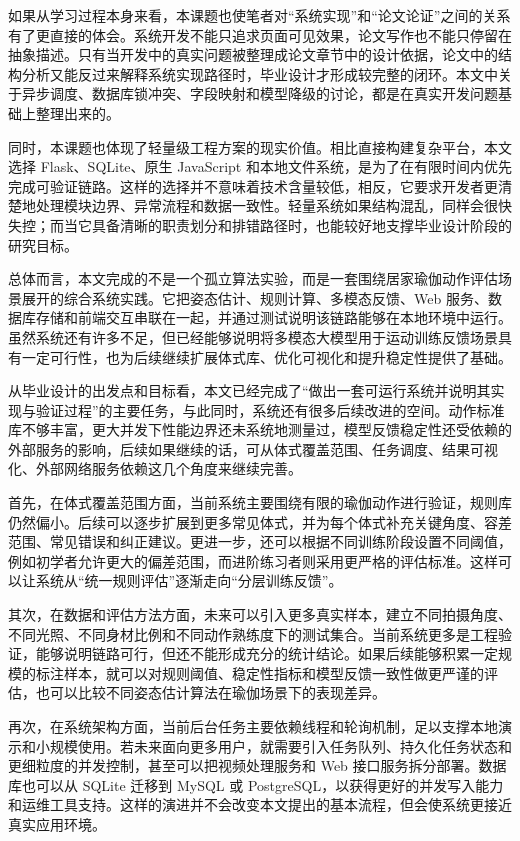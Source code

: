 如果从学习过程本身来看，本课题也使笔者对“系统实现”和“论文论证”之间的关系有了更直接的体会。系统开发不能只追求页面可见效果，论文写作也不能只停留在抽象描述。只有当开发中的真实问题被整理成论文章节中的设计依据，论文中的结构分析又能反过来解释系统实现路径时，毕业设计才形成较完整的闭环。本文中关于异步调度、数据库锁冲突、字段映射和模型降级的讨论，都是在真实开发问题基础上整理出来的。

同时，本课题也体现了轻量级工程方案的现实价值。相比直接构建复杂平台，本文选择 Flask、SQLite、原生 JavaScript 和本地文件系统，是为了在有限时间内优先完成可验证链路。这样的选择并不意味着技术含量较低，相反，它要求开发者更清楚地处理模块边界、异常流程和数据一致性。轻量系统如果结构混乱，同样会很快失控；而当它具备清晰的职责划分和排错路径时，也能较好地支撑毕业设计阶段的研究目标。

总体而言，本文完成的不是一个孤立算法实验，而是一套围绕居家瑜伽动作评估场景展开的综合系统实践。它把姿态估计、规则计算、多模态反馈、Web 服务、数据库存储和前端交互串联在一起，并通过测试说明该链路能够在本地环境中运行。虽然系统还有许多不足，但已经能够说明将多模态大模型用于运动训练反馈场景具有一定可行性，也为后续继续扩展体式库、优化可视化和提升稳定性提供了基础。

从毕业设计的出发点和目标看，本文已经完成了“做出一套可运行系统并说明其实现与验证过程”的主要任务，与此同时，系统还有很多后续改进的空间。动作标准库不够丰富，更大并发下性能边界还未系统地测量过，模型反馈稳定性还受依赖的外部服务的影响，后续如果继续的话，可从体式覆盖范围、任务调度、结果可视化、外部网络服务依赖这几个角度来继续完善。

首先，在体式覆盖范围方面，当前系统主要围绕有限的瑜伽动作进行验证，规则库仍然偏小。后续可以逐步扩展到更多常见体式，并为每个体式补充关键角度、容差范围、常见错误和纠正建议。更进一步，还可以根据不同训练阶段设置不同阈值，例如初学者允许更大的偏差范围，而进阶练习者则采用更严格的评估标准。这样可以让系统从“统一规则评估”逐渐走向“分层训练反馈”。

其次，在数据和评估方法方面，未来可以引入更多真实样本，建立不同拍摄角度、不同光照、不同身材比例和不同动作熟练度下的测试集合。当前系统更多是工程验证，能够说明链路可行，但还不能形成充分的统计结论。如果后续能够积累一定规模的标注样本，就可以对规则阈值、稳定性指标和模型反馈一致性做更严谨的评估，也可以比较不同姿态估计算法在瑜伽场景下的表现差异。

再次，在系统架构方面，当前后台任务主要依赖线程和轮询机制，足以支撑本地演示和小规模使用。若未来面向更多用户，就需要引入任务队列、持久化任务状态和更细粒度的并发控制，甚至可以把视频处理服务和 Web 接口服务拆分部署。数据库也可以从 SQLite 迁移到 MySQL 或 PostgreSQL，以获得更好的并发写入能力和运维工具支持。这样的演进并不会改变本文提出的基本流程，但会使系统更接近真实应用环境。

